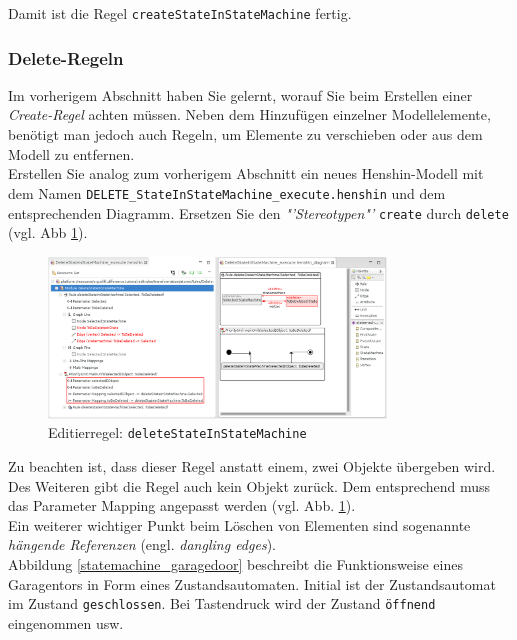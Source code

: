 \documentclass[a4paper]{scrartcl}
\begin{document}
Damit ist die Regel \texttt{createStateInStateMachine} fertig.


\subsubsection*{Delete-Regeln}

Im vorherigem Abschnitt haben Sie gelernt, worauf Sie beim Erstellen einer \textit{Create-Regel} achten müssen.
Neben dem Hinzufügen einzelner Modellelemente, benötigt man jedoch auch Regeln, um Elemente zu verschieben oder aus dem Modell zu entfernen.\\
Erstellen Sie analog zum vorherigem Abschnitt ein neues Henshin-Modell mit dem Namen \texttt{DELETE\_StateInStateMachine\_execute.henshin} und dem entsprechenden Diagramm.
Ersetzen Sie den \textit{"'Stereotypen"'} \texttt{create} durch \texttt{delete} (vgl. Abb \ref{silift-editrule_deleteStateInStateMachine}).

\begin{figure}[H]
\centering
\includegraphics[width=0.8\textwidth]{graphics/silift-editrule_delete_stateInStateMachine.png}
\caption{Editierregel: \texttt{deleteStateInStateMachine}}
\label{silift-editrule_deleteStateInStateMachine}
\end{figure}

Zu beachten ist, dass dieser Regel anstatt einem, zwei Objekte übergeben wird. 
Des Weiteren gibt die Regel auch kein Objekt zurück. 
Dem entsprechend muss das Parameter Mapping angepasst werden (vgl. Abb. \ref{silift-editrule_deleteStateInStateMachine}).\\
Ein weiterer wichtiger Punkt beim Löschen von Elementen sind sogenannte \textit{hängende Referenzen} (engl. \textit{dangling edges}).\\
Abbildung \ref{statemachine_garagedoor} beschreibt die Funktionsweise eines Garagentors in Form eines Zustandsautomaten. 
Initial ist der Zustandsautomat im Zustand \texttt{geschlossen}. 
Bei Tastendruck wird der Zustand \texttt{öffnend} eingenommen usw.
\end{document}
